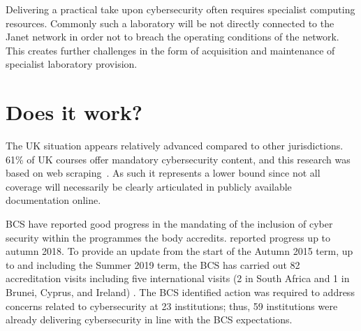 \documentclass[sigconf]{acmart}
\begin{document}
\begin{comment}
For example, research into the state of IT conducted annually by Enterprise Strategy Group (ESG) has revealed that the skills gap in information security continues to widen and has doubled in the past five years; in 2014, 23\% of respondents to the survey stated that their organisation had a problematic shortage of information security skills -- this had climbed to 51\% at the beginning of 2018~\cite{ESG:2018}. Clearly, cybersecurity is an issue which is being felt across many industries and organisations, and is a concern which extends beyond IT leadership into the boardroom~\cite{Ackerman2019a}.


The ESG survey is international, but ESG have confirmed that the UK figures are very similar. In the UK, there has been a resurgence of job adverts to recruit academic staff with specialisms in cybersecurity over the past three years. 
\end{comment}



Delivering a practical take upon cybersecurity often requires specialist computing resources. Commonly such a laboratory will be not directly connected to the Janet network in order not to breach the operating conditions of the network. This creates further challenges in the form of acquisition and maintenance of specialist laboratory provision.

\section {Does it work?}	
The UK situation appears relatively advanced compared to other jurisdictions. 61\% of UK courses offer mandatory cybersecurity content, and this research was based on web scraping~\cite[Table 1]{Ruiz2019a}. As such it represents a lower bound since not all coverage will necessarily be clearly articulated in publicly available documentation online.

BCS have reported good progress in the mandating of the inclusion of cyber security within the programmes the body accredits. \cite{Cricketal2019} reported progress up to  autumn 2018. To provide an update from the start of the Autumn 2015 term, up to and including the Summer 2019 term, the BCS has carried out 82 accreditation visits including five international visits (2 in South Africa and 1 in Brunei, Cyprus, and Ireland) . The BCS identified action was required to address concerns related to cybersecurity at 23 institutions; thus, 59 institutions were already delivering cybersecurity in line with the BCS expectations.
\end{document}
